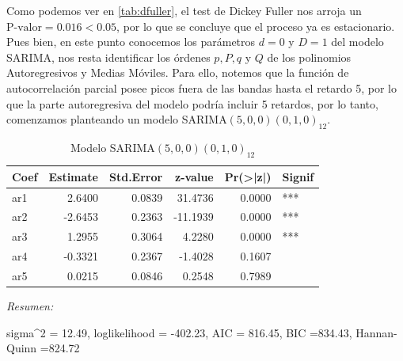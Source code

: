 \documentclass[12pt,oneside]{book}\usepackage[]{graphicx}\usepackage[]{color}
\newenvironment{knitrout}{}{} %
\theoremstyle{definition} %
\begin{document}







Como podemos ver en \ref{tab:dfuller}, el test de Dickey Fuller nos arroja un $\text{P-valor} = 0.016 < 0.05$, por lo que se concluye que el proceso ya es estacionario. Pues bien, en este punto conocemos los parámetros $d=0$ y $D=1$ del modelo SARIMA, nos resta identificar los órdenes $p, P, q$ y $Q$ de los polinomios Autoregresivos y Medias Móviles. Para ello, notemos que la función de autocorrelación parcial posee picos fuera de las  bandas hasta el retardo 5, por lo que la parte autoregresiva del modelo podría incluir 5 retardos, por lo tanto, comenzamos planteando un modelo SARIMA$(5,0,0)(0,1,0)_{12}$. 

\begin{knitrout}
\color{fgcolor}\begin{table}

\caption{\label{tab:unnamed-chunk-13}\label{mod:sarima1}Modelo SARIMA$(5,0,0)(0,1,0)_{12}$}
\centering
\begin{threeparttable}
\begin{tabular}[t]{lrrrrl}
\toprule
Coef & Estimate & Std.Error & z-value & Pr(>|z|) & Signif\\
\midrule
\rowcolor{gray!6}  ar1 & 2.6400 & 0.0839 & 31.4736 & 0.0000 & ***\\
ar2 & -2.6453 & 0.2363 & -11.1939 & 0.0000 & ***\\
\rowcolor{gray!6}  ar3 & 1.2955 & 0.3064 & 4.2280 & 0.0000 & ***\\
ar4 & -0.3321 & 0.2367 & -1.4028 & 0.1607 & \\
\rowcolor{gray!6}  ar5 & 0.0215 & 0.0846 & 0.2548 & 0.7989 & \\
\bottomrule
\end{tabular}
\begin{tablenotes}
\item \textit{Resumen:} 
\item sigma\textasciicircum{}2 = 12.49, loglikelihood = -402.23, AIC = 816.45, BIC =834.43, Hannan-Quinn =824.72
\end{tablenotes}
\end{threeparttable}
\end{table}


\end{knitrout}
\end{document}
